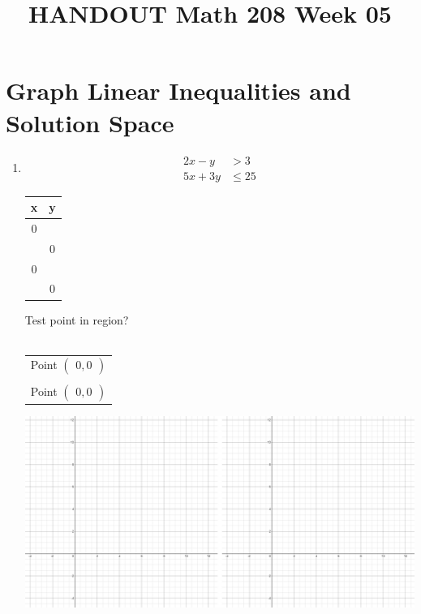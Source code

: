 \documentclass[14pt]{extarticle}
\title{\vspace{-5ex}HANDOUT Math 208 Week 05}
\date{\vspace{-10ex}}
\begin{document}
\maketitle	
{}	
\section{Graph Linear Inequalities and Solution Space}
\begin{enumerate}
	\item \begin{multicols}{3}
		\begin{align*}
			2x-y &> 3 \\
			5x+3y &\leq 25
		\end{align*}
		\vfill\null
		\columnbreak
		\begin{tabular}{c|c}
			x & y \\ \hline
			0 &  \\
			 & 0 \\ \hline
			0 &  \\
			 & 0
		\end{tabular}
		\vfill\null
		\columnbreak
		Test point in region? \\\\
		\begin{tabular}{c}
			Point $\left(\begin{array}{c}0 , 0 \end{array}\right)$ \\\\
			Point $\left(\begin{array}{c}0 , 0 \end{array}\right)$
		\end{tabular}
		\vfill\null
	\end{multicols}

\hspace{-1.5cm}\includegraphics[width=1.1\linewidth]{empty-graphax2}
	

\end{enumerate}
\end{document}
